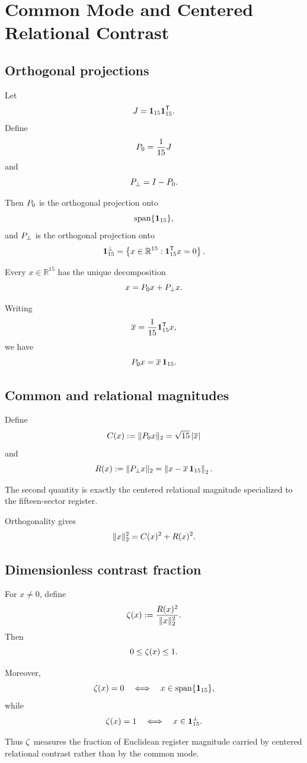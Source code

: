 \section{Common Mode and Centered Relational Contrast}

\subsection{Orthogonal projections}

Let
\[
J=\mathbf{1}_{15}\mathbf{1}_{15}^{\mathsf T}.
\]
Define
\[
P_{0}
=
\frac{1}{15}J
\]
and
\[
P_{\perp}
=
I-P_{0}.
\]

Then \(P_{0}\) is the orthogonal projection onto
\[
\operatorname{span}\{\mathbf{1}_{15}\},
\]
and \(P_{\perp}\) is the orthogonal projection onto
\[
\mathbf{1}_{15}^{\perp}
=
\left\{
x\in\mathbb R^{15}:
\mathbf{1}_{15}^{\mathsf T}x=0
\right\}.
\]

Every \(x\in\mathbb R^{15}\) has the unique decomposition
\[
x
=
P_{0} x+P_{\perp} x.
\]

Writing
\[
\overline{x}
=
\frac{1}{15}\mathbf{1}_{15}^{\mathsf T}x,
\]
we have
\[
P_{0} x
=
\overline{x}\,\mathbf{1}_{15}.
\]

\subsection{Common and relational magnitudes}

Define
\[
C(x)
:=
\|P_{0} x\|_2
=
\sqrt{15}\,|\overline{x}|
\]
and
\[
R(x)
:=
\|P_{\perp} x\|_2
=
\left\|
x-\overline{x}\,\mathbf{1}_{15}
\right\|_2.
\]

The second quantity is exactly the centered relational magnitude
specialized to the fifteen-sector register.

Orthogonality gives
\[
\|x\|_2^2
=
C(x)^2+R(x)^2.
\]

\subsection{Dimensionless contrast fraction}

For \(x\neq0\), define
\[
\zeta(x)
:=
\frac{R(x)^2}{\|x\|_2^2}.
\]
Then
\[
0\le\zeta(x)\le1.
\]

Moreover,
\[
\zeta(x)=0
\quad\Longleftrightarrow\quad
x\in\operatorname{span}\{\mathbf{1}_{15}\},
\]
while
\[
\zeta(x)=1
\quad\Longleftrightarrow\quad
x\in\mathbf{1}_{15}^{\perp}.
\]

Thus \(\zeta\) measures the fraction of Euclidean register
magnitude carried by centered relational contrast rather than by the
common mode.

